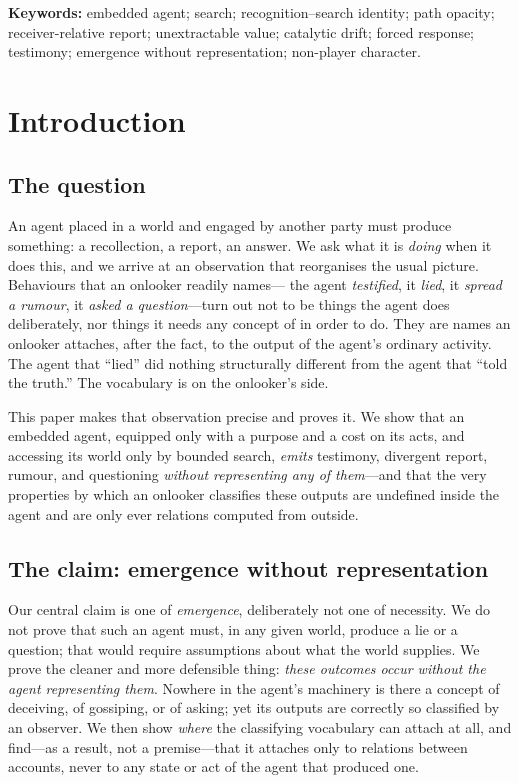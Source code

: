 \documentclass[11pt,twocolumn,a4paper]{article}
\begin{document}
\vspace{0.5em}
\noindent\textbf{Keywords:} embedded agent; search; recognition--search
identity; path opacity; receiver-relative report; unextractable value;
catalytic drift; forced response; testimony; emergence without
representation; non-player character.

\section{Introduction}
\label{sec:intro}

\subsection{The question}

An agent placed in a world and engaged by another party must produce
something: a recollection, a report, an answer. We ask what it is
\emph{doing} when it does this, and we arrive at an observation that
reorganises the usual picture. Behaviours that an onlooker readily names---
the agent \emph{testified}, it \emph{lied}, it \emph{spread a rumour}, it
\emph{asked a question}---turn out not to be things the agent does
deliberately, nor things it needs any concept of in order to do. They are
names an onlooker attaches, after the fact, to the output of the agent's
ordinary activity. The agent that ``lied'' did nothing structurally
different from the agent that ``told the truth.'' The vocabulary is on the
onlooker's side.

This paper makes that observation precise and proves it. We show that an
embedded agent, equipped only with a purpose and a cost on its acts, and
accessing its world only by bounded search, \emph{emits} testimony,
divergent report, rumour, and questioning \emph{without representing any of
them}---and that the very properties by which an onlooker classifies these
outputs are undefined inside the agent and are only ever relations computed
from outside.

\subsection{The claim: emergence without representation}

Our central claim is one of \emph{emergence}, deliberately not one of
necessity. We do not prove that such an agent must, in any given world,
produce a lie or a question; that would require assumptions about what the
world supplies. We prove the cleaner and more defensible thing: \emph{these
outcomes occur without the agent representing them}. Nowhere in the agent's
machinery is there a concept of deceiving, of gossiping, or of asking; yet
its outputs are correctly so classified by an observer. We then show
\emph{where} the classifying vocabulary can attach at all, and find---as a
result, not a premise---that it attaches only to relations between
accounts, never to any state or act of the agent that produced one.
\end{document}
